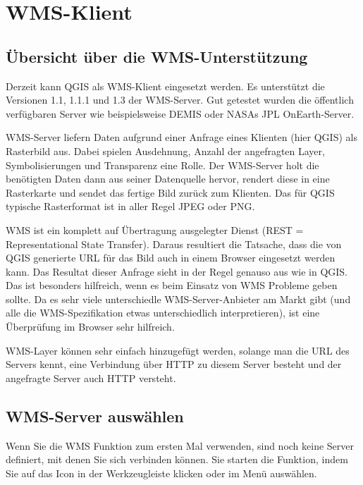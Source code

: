 \section{WMS-Klient}\label{sec:ogc-wms}

\subsection{Übersicht über die
WMS-Unterstützung}\label{sec:ogc-wms-about}

Derzeit kann QGIS als WMS-Klient eingesetzt werden. Es unterstützt die
Versionen 1.1, 1.1.1 und 1.3 der WMS-Server. Gut getestet wurden die
öffentlich verfügbaren Server wie beispielsweise DEMIS oder NASAs JPL
OnEarth-Server.

WMS-Server liefern Daten aufgrund einer Anfrage eines Klienten (hier QGIS)
als Rasterbild aus. Dabei spielen Ausdehnung, Anzahl der angefragten Layer,
Symbolisierungen und Transparenz eine Rolle. Der WMS-Server holt die
benötigten Daten dann aus seiner Datenquelle hervor, rendert diese in eine
Rasterkarte und sendet das fertige Bild zurück zum Klienten. Das für QGIS
typische Rasterformat ist in aller Regel JPEG oder PNG.

WMS ist ein komplett auf Übertragung ausgelegter Dienst (REST =
Representational State Transfer). Daraus resultiert die Tatsache, dass die
von QGIS generierte URL für das Bild auch in einem Browser eingesetzt werden
kann. Das Resultat dieser Anfrage sieht in der Regel genauso aus wie in QGIS.
Das ist besonders hilfreich, wenn es beim Einsatz von WMS Probleme geben
sollte. Da es sehr viele unterschiedle WMS-Server-Anbieter am Markt gibt (und
alle die WMS-Spezifikation etwas unterschiedlich interpretieren), ist eine
Überprüfung im Browser sehr hilfreich.

WMS-Layer können sehr einfach hinzugefügt werden, solange man die URL des
Servers kennt, eine Verbindung über HTTP zu diesem Server besteht und der
angefragte Server auch HTTP versteht.

\subsection{WMS-Server auswählen}
\label{sec:ogc-wms-servers}

Wenn Sie die WMS Funktion zum ersten Mal verwenden, sind noch keine Server
definiert, mit denen Sie sich verbinden können. Sie starten die Funktion,
indem Sie auf das Icon 
in der Werkzeugleiste klicken oder im Menü
 \arrow {}
auswählen.

